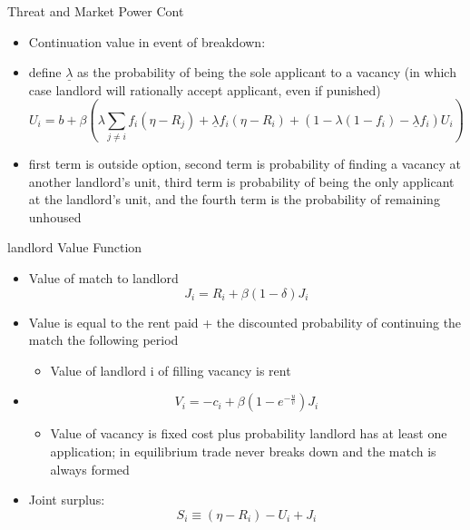 \documentclass[10pt, xcolor=dvipsnames]{beamer}
\begin{document}
\begin{frame}{Threat and Market Power Cont}
    \begin{itemize}
         \item Continuation value in event of breakdown:
        \item define \textbf{$\underline{\lambda}$} as the probability of being the sole applicant to a vacancy (in which case landlord will rationally accept applicant, even if punished)
        \begin{equation}\label{eq:match-val}
            U_i = b + \beta \left(\lambda\sum_{j\neq i}f_i(\eta - R_j) + \underline{\lambda} f_i(\eta - R_i) + (1-\lambda(1-f_i) - \underline{\lambda} f_i)U_i\right)
        \end{equation}
        \item first term is outside option, second term is probability of finding a vacancy at another landlord's unit, third term is probability of being the only applicant at the landlord's unit, and the fourth term is the probability of remaining unhoused
    \end{itemize}
\end{frame}

\begin{frame}{landlord Value Function}
    \begin{itemize}
    \item Value of match to landlord \begin{equation}
        J_i = R_i + \beta(1 - \delta)J_i
    \end{equation} 
    \item Value is equal to the rent paid + the discounted probability of continuing the match the following period 
    \begin{itemize}
        \item Value of landlord i of filling vacancy is rent
    \end{itemize}
    \item \begin{equation}\label{eq:job-value}
        V_i = -c_i + \beta(1  - e^{-\frac{u}{v}})J_i
    \end{equation}
    \begin{itemize}
        \item Value of vacancy is fixed cost plus probability landlord has at least one application; in equilibrium trade never breaks down and the match is always formed 
    \end{itemize}
    \item Joint surplus: \begin{equation}\label{eq:surplus-value}
        S_i \equiv (\eta - R_i) - U_i + J_i
    \end{equation}
    \end{itemize}
\end{frame}
\end{document}
